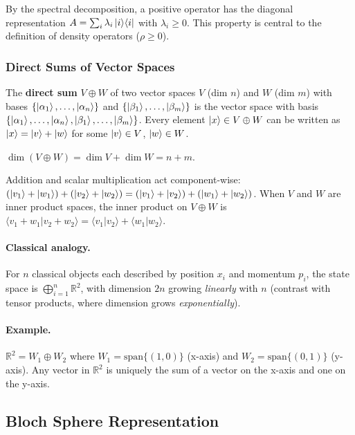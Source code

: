 \documentclass[10pt,a4paper]{article}
\begin{document}
By the spectral decomposition, a positive operator has the diagonal representation $A=\sum_i\lambda_i\ket{i}\!\bra{i}$ with $\lambda_i\ge 0$. This property is central to the definition of density operators ($\rho\ge 0$).

\subsubsection*{Direct Sums of Vector Spaces}

\begin{tcolorbox}[defstyle, title={Definition: Direct Sum}]
The \textbf{direct sum} $V\oplus W$ of two vector spaces $V$ (dim $n$) and $W$ (dim $m$) with bases $\{\ket{\alpha_1},\ldots,\ket{\alpha_n}\}$ and $\{\ket{\beta_1},\ldots,\ket{\beta_m}\}$ is the vector space with basis $\{\ket{\alpha_1},\ldots,\ket{\alpha_n},\ket{\beta_1},\ldots,\ket{\beta_m}\}$. Every element $\ket{x}\in V\oplus W$ can be written as $\ket{x}=\ket{v}+\ket{w}$ for some $\ket{v}\in V$, $\ket{w}\in W$.

$\dim(V\oplus W)=\dim V+\dim W=n+m$.
\end{tcolorbox}

Addition and scalar multiplication act component-wise: $(\ket{v_1}+\ket{w_1})+(\ket{v_2}+\ket{w_2})=(\ket{v_1}+\ket{v_2})+(\ket{w_1}+\ket{w_2})$. When $V$ and $W$ are inner product spaces, the inner product on $V\oplus W$ is $\langle v_1+w_1|v_2+w_2\rangle=\langle v_1|v_2\rangle+\langle w_1|w_2\rangle$.

\paragraph{Classical analogy.} For $n$ classical objects each described by position $x_i$ and momentum $p_i$, the state space is $\bigoplus_{i=1}^n\mathbb{R}^2$, with dimension $2n$ growing \emph{linearly} with $n$ (contrast with tensor products, where dimension grows \emph{exponentially}).

\paragraph{Example.} $\mathbb{R}^2=W_1\oplus W_2$ where $W_1=\mathrm{span}\{(1,0)\}$ (x-axis) and $W_2=\mathrm{span}\{(0,1)\}$ (y-axis). Any vector in $\mathbb{R}^2$ is uniquely the sum of a vector on the x-axis and one on the y-axis.

\subsection{Bloch Sphere Representation}
\end{document}

